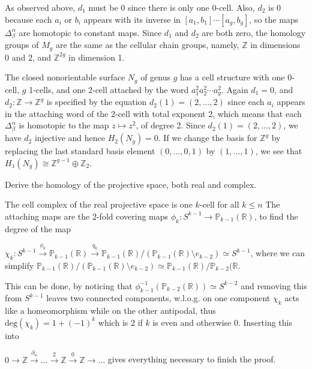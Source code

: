 As observed above, \(d_1\) must be 0 since there is only one 0-cell. 
Also, \(d_2\) is 0 because each \(a_i\) or \(b_i\) appears with its inverse in \([a_1, b_1] \dotsm [a_g, b_g]\), so the maps \(\Delta_{\beta}^\alpha\) are homotopic to constant maps. 
Since \(d_1\) and \(d_2\) are both zero, the homology groups of \(M_g\) are the same as the cellular chain groups, namely, 
\(\mathbb{Z}\) in dimensions 0 and 2, and \(\mathbb{Z}^{2g}\) in dimension 1.


The closed nonorientable surface \(N_g\) of genus \(g\) has a cell structure
with one 0-cell, \(g\) 1-cells, and one 2-cell attached by the word \(a_1^2 a_2^2 \dotsm a_g^2\). Again
\(d_1 = 0\), and \(d_2 : \mathbb{Z} \to \mathbb{Z}^g\) is specified by the equation \(d_2(1) = (2, \dotsc , 2)\) since each \(a_i\)
appears in the attaching word of the 2-cell with total exponent 2, which means that
each \(\Delta_{\beta}^\alpha\) is homotopic to the map \(z \mapsto z^2\), of degree 2. Since \(d_2(1) = (2, \dotsc , 2)\), we
have \(d_2\) injective and hence \(H_2(N_g) = 0\). If we change the basis for \(\mathbb{Z}^g\) by replacing
the last standard basis element \((0, \dotsc, 0, 1)\) by \((1, \dotsc , 1)\), we see that \(H_1(N_g) \cong 
\mathbb{Z}^{g-1} \oplus \mathbb{Z}_2\).


Derive the homology of the projective space, both real and complex. 

The cell complex of the real projective space  is one \( k \)-cell for all \( k \leq n \)
The attaching maps are the 2-fold covering maps \( \phi_k : S^{k-1} \to \mathbb{P}_{k-1}(\mathbb{R}) \),
to find the degree of the map

\( \chi_k : S^{k-1} \xrightarrow{\phi_k} \mathbb{P}_{k-1}(\mathbb{R}) \xrightarrow{q_k} \mathbb{P}_{k-1}(\mathbb{R})/(\mathbb{P}_{k-1}(\mathbb{R}) \setminus e_{k-2}) \simeq S^{k-1}\),
where we can simplify \( \mathbb{P}_{k-1}(\mathbb{R})/(\mathbb{P}_{k-1}(\mathbb{R}) \setminus e_{k-2}) \simeq \mathbb{P}_{k-1}(\mathbb{R})/\mathbb{P}_{k-2}(\mathbb{R} \).

This can be done, by noticing that \( \phi_{k-1}^{-1}(\mathbb{P}_{k-2}(\mathbb{R})) \simeq S^{k-2} \) and removing this from \( S^{k-1} \) leaves two connected components,
w.l.o.g. on one component \( \chi_k \) acts like a homeomorphism while on the other antipodal, thus  \( \text{deg}(\chi_k) = 1 + (-1)^k \) which is \( 2 \) if 
\( k \) is even and otherwise \( 0 \). Inserting this into

\(0 \longrightarrow \mathbb{Z} \xrightarrow{\partial_n} \dots \xrightarrow{2} \mathbb{Z} \xrightarrow{0} \mathbb{Z} \longrightarrow \dots \)
gives everything necessary to finish the proof.

